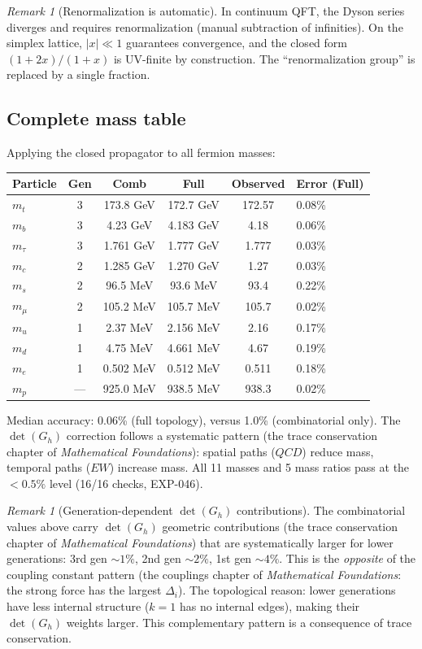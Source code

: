 \documentclass[12pt]{article}
\theoremstyle{remark}
\newtheorem{remark}[theorem]{Remark}
\theoremstyle{definition}
\begin{document}
\begin{remark}[Renormalization is automatic]
In continuum QFT, the Dyson series diverges and requires renormalization (manual subtraction of infinities).  On the simplex lattice, $|x| \ll 1$ guarantees convergence, and the closed form $(1+2x)/(1+x)$ is UV-finite by construction.  The ``renormalization group'' is replaced by a single fraction.
\end{remark}

\subsection{Complete mass table}

Applying the closed propagator to all fermion masses:

\begin{center}
\begin{tabular}{lccccl}
\hline
Particle & Gen & Comb & Full & Observed & Error (Full) \\
\hline
$m_t$ & 3 & 173.8 GeV & 172.7 GeV & 172.57 & 0.08\% \\
$m_b$ & 3 & 4.23 GeV & 4.183 GeV & 4.18 & 0.06\% \\
$m_\tau$ & 3 & 1.761 GeV & 1.777 GeV & 1.777 & 0.03\% \\
\hline
$m_c$ & 2 & 1.285 GeV & 1.270 GeV & 1.27 & 0.03\% \\
$m_s$ & 2 & 96.5 MeV & 93.6 MeV & 93.4 & 0.22\% \\
$m_\mu$ & 2 & 105.2 MeV & 105.7 MeV & 105.7 & 0.02\% \\
\hline
$m_u$ & 1 & 2.37 MeV & 2.156 MeV & 2.16 & 0.17\% \\
$m_d$ & 1 & 4.75 MeV & 4.661 MeV & 4.67 & 0.19\% \\
$m_e$ & 1 & 0.502 MeV & 0.512 MeV & 0.511 & 0.18\% \\
\hline
$m_p$ & --- & 925.0 MeV & 938.5 MeV & 938.3 & 0.02\% \\
\hline
\end{tabular}
\end{center}

Median accuracy: 0.06\% (full topology), versus 1.0\% (combinatorial only).  The $\det(G_h)$ correction follows a systematic pattern (the trace conservation chapter of \textit{Mathematical Foundations}): spatial paths ($QCD$) reduce mass, temporal paths ($EW$) increase mass.  All 11 masses and 5 mass ratios pass at the $< 0.5\%$ level (16/16 checks, EXP-046).

\begin{remark}[Generation-dependent $\det(G_h)$ contributions]
The combinatorial values above carry $\det(G_h)$ geometric contributions (the trace conservation chapter of \textit{Mathematical Foundations}) that are systematically larger for lower generations: 3rd gen $\sim 1\%$, 2nd gen $\sim 2\%$, 1st gen $\sim 4\%$. This is the \emph{opposite} of the coupling constant pattern (the couplings chapter of \textit{Mathematical Foundations}: the strong force has the largest $\Delta_i$). The topological reason: lower generations have less internal structure ($k = 1$ has no internal edges), making their $\det(G_h)$ weights larger. This complementary pattern is a consequence of trace conservation.
\end{remark}
\end{document}
